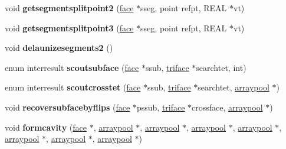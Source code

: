 \begin{DoxyCompactItemize}
\item 
\hypertarget{classtetgenmesh_a2418e2e5b369347423e8fa480194ce66}{void {\bfseries getsegmentsplitpoint2} (\hyperlink{classtetgenmesh_1_1face}{face} $\ast$sseg, point refpt, R\-E\-A\-L $\ast$vt)}\label{classtetgenmesh_a2418e2e5b369347423e8fa480194ce66}

\item 
\hypertarget{classtetgenmesh_abc5955dc0a514d4fe378718f6eccec02}{void {\bfseries getsegmentsplitpoint3} (\hyperlink{classtetgenmesh_1_1face}{face} $\ast$sseg, point refpt, R\-E\-A\-L $\ast$vt)}\label{classtetgenmesh_abc5955dc0a514d4fe378718f6eccec02}

\item 
\hypertarget{classtetgenmesh_a71b266737f03ea0522dbf909c4123780}{void {\bfseries delaunizesegments2} ()}\label{classtetgenmesh_a71b266737f03ea0522dbf909c4123780}

\item 
\hypertarget{classtetgenmesh_ad1bedc354dc7b07b080a9e60469a8874}{enum interresult {\bfseries scoutsubface} (\hyperlink{classtetgenmesh_1_1face}{face} $\ast$ssub, \hyperlink{classtetgenmesh_1_1triface}{triface} $\ast$searchtet, int)}\label{classtetgenmesh_ad1bedc354dc7b07b080a9e60469a8874}

\item 
\hypertarget{classtetgenmesh_a859af7e7abe94484411bd3e53c819707}{enum interresult {\bfseries scoutcrosstet} (\hyperlink{classtetgenmesh_1_1face}{face} $\ast$ssub, \hyperlink{classtetgenmesh_1_1triface}{triface} $\ast$searchtet, \hyperlink{classtetgenmesh_1_1arraypool}{arraypool} $\ast$)}\label{classtetgenmesh_a859af7e7abe94484411bd3e53c819707}

\item 
\hypertarget{classtetgenmesh_af6e9021de2f486276e9d6b991aef7e51}{void {\bfseries recoversubfacebyflips} (\hyperlink{classtetgenmesh_1_1face}{face} $\ast$pssub, \hyperlink{classtetgenmesh_1_1triface}{triface} $\ast$crossface, \hyperlink{classtetgenmesh_1_1arraypool}{arraypool} $\ast$)}\label{classtetgenmesh_af6e9021de2f486276e9d6b991aef7e51}

\item 
\hypertarget{classtetgenmesh_aa41bedbe1ebfe3987f805928ce8cc26d}{void {\bfseries formcavity} (\hyperlink{classtetgenmesh_1_1face}{face} $\ast$, \hyperlink{classtetgenmesh_1_1arraypool}{arraypool} $\ast$, \hyperlink{classtetgenmesh_1_1arraypool}{arraypool} $\ast$, \hyperlink{classtetgenmesh_1_1arraypool}{arraypool} $\ast$, \hyperlink{classtetgenmesh_1_1arraypool}{arraypool} $\ast$, \hyperlink{classtetgenmesh_1_1arraypool}{arraypool} $\ast$, \hyperlink{classtetgenmesh_1_1arraypool}{arraypool} $\ast$, \hyperlink{classtetgenmesh_1_1arraypool}{arraypool} $\ast$)}\label{classtetgenmesh_aa41bedbe1ebfe3987f805928ce8cc26d}


\end{DoxyCompactItemize}
